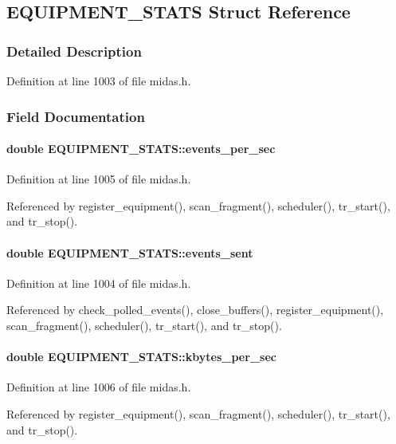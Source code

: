 \subsection{EQUIPMENT\_\-STATS Struct Reference}
\label{structEQUIPMENT__STATS}


\subsubsection{Detailed Description}


Definition at line 1003 of file midas.h.

\subsubsection{Field Documentation}
\paragraph[{events\_\-per\_\-sec}]{\setlength{\rightskip}{0pt plus 5cm}double {\bf EQUIPMENT\_\-STATS::events\_\-per\_\-sec}}\hfill\label{structEQUIPMENT__STATS_a218c744ea441413af262fbd5ddf3780f}


Definition at line 1005 of file midas.h.

Referenced by register\_\-equipment(), scan\_\-fragment(), scheduler(), tr\_\-start(), and tr\_\-stop().
\paragraph[{events\_\-sent}]{\setlength{\rightskip}{0pt plus 5cm}double {\bf EQUIPMENT\_\-STATS::events\_\-sent}}\hfill\label{structEQUIPMENT__STATS_a6e140b7938891bd8452fdf0217815ddd}


Definition at line 1004 of file midas.h.

Referenced by check\_\-polled\_\-events(), close\_\-buffers(), register\_\-equipment(), scan\_\-fragment(), scheduler(), tr\_\-start(), and tr\_\-stop().
\paragraph[{kbytes\_\-per\_\-sec}]{\setlength{\rightskip}{0pt plus 5cm}double {\bf EQUIPMENT\_\-STATS::kbytes\_\-per\_\-sec}}\hfill\label{structEQUIPMENT__STATS_a7a7a7d4b78841a36d156a0941616538f}


Definition at line 1006 of file midas.h.

Referenced by register\_\-equipment(), scan\_\-fragment(), scheduler(), tr\_\-start(), and tr\_\-stop().